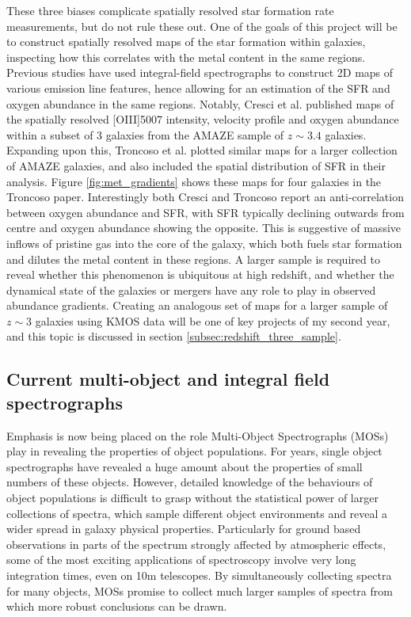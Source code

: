 \documentclass{literature}
\begin{document}
These three biases complicate spatially resolved star formation rate measurements, but do not rule these out. One of the goals of this project will be to construct spatially resolved maps of the star formation within galaxies, inspecting how this correlates with the metal content in the same regions. Previous studies have used integral-field spectrographs to construct 2D maps of various emission line features, hence allowing for an estimation of the SFR and oxygen abundance in the same regions. Notably, Cresci et al. \citep{Cresci2010} published maps of the spatially resolved [OIII]5007 intensity, velocity profile and oxygen abundance within a subset of 3 galaxies from the AMAZE sample \citep{Maiolino2008} of $z \sim 3.4$ galaxies. Expanding upon this, Troncoso et al. \citep{Troncoso_2014} plotted similar maps for a larger collection of AMAZE galaxies, and also included the spatial distribution of SFR in their analysis. Figure \ref{fig:met_gradients} shows these maps for four galaxies in the Troncoso paper. Interestingly both Cresci and Troncoso report an anti-correlation between oxygen abundance and SFR, with SFR typically declining outwards from centre and oxygen abundance showing the opposite. This is suggestive of massive inflows of pristine gas into the core of the galaxy, which both fuels star formation and dilutes the metal content in these regions. A larger sample is required to reveal whether this phenomenon is ubiquitous at high redshift, and whether the dynamical state of the galaxies or mergers have any role to play in observed abundance gradients. Creating an analogous set of maps for a larger sample of $z \sim 3$ galaxies using KMOS data will be one of key projects of my second year, and this topic is discussed in section \ref{subsec:redshift_three_sample}.


\subsection{Current multi-object and integral field spectrographs}\label{subsec:current_int}
	
Emphasis is now being placed on the role Multi-Object Spectrographs (MOSs) play in revealing the properties of object populations. For years, single object spectrographs have revealed a huge amount about the properties of small numbers of these objects. However, detailed knowledge of the behaviours of object populations is difficult to grasp without the statistical power of larger collections of spectra, which sample different object environments and reveal a wider spread in galaxy physical properties. Particularly for ground based observations in parts of the spectrum strongly affected by atmospheric effects, some of the most exciting applications of spectroscopy involve very long integration times, even on 10m telescopes. By simultaneously collecting spectra for many objects, MOSs promise to collect much larger samples of spectra from which more robust conclusions can be drawn. \\
\end{document}
